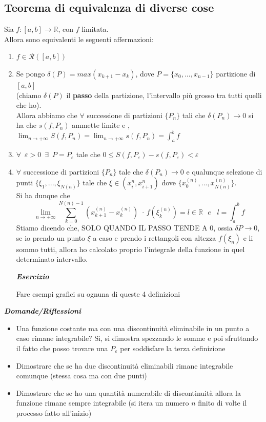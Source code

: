 \documentclass{article}
\theoremstyle{definition}
\newcommand{\R}{\mathbb{R}}
\begin{document}
\subsection{Teorema di equivalenza di diverse cose}
Sia $f:[a,b] \to \R$, con $f$ limitata.
\\
Allora sono equivalenti le seguenti affermazioni:
\begin{enumerate}
    \item $f \in \mathcal{R}([a,b])$
    \item Se pongo $\delta(P)=max (x_{k+1}-x_k)$, dove $P=\{x_0,...,x_{n-1}\}$ partizione di $[a,b]$
    \\
    (chiamo $\delta(P)$ il \textbf{passo} della partizione, l'intervallo più grosso tra tutti quelli che ho).
    \\
    Allora abbiamo che $\forall$ successione di partizioni $\{P_n\}$ tali che $\delta(P_n) \to 0$ si ha che $s(f,P_n)$ ammette limite e , $\lim_{n \to +\infty} S(f,P_n)=\lim_{n \to +\infty}s(f,P_n)=\int_a^b f$
    \item $\forall \,\,\, \varepsilon > 0 \,\,\, \exists \,\,\, P=P_\varepsilon$ tale che $0 \leqslant S(f,P_\varepsilon)-s(f,P_\varepsilon) < \varepsilon$
    \item $\forall $ successione di partizioni $\{P_n\}$ tale che $\delta(P_n) \to 0$ e qualunque selezione di punti $\{\xi_1,...,\xi_{N(n)}\}$ tale che $\xi \in (x_i^n, x_{i+1}^n)$ dove $\{x_0^{(n)},...,x_{N(n)}^{(n)}\}$.
    \\
    Si ha dunque che
    \begin{equation}
    \lim_{n \to +\infty} \sum_{k=0}^{N(n)-1}(x_{k+1}^{(n)}-x_k^{(n)}) \,\, \cdot \, f(\xi_k^{(n)})=l \in \R \,\,\,\, e \,\,\,\,\,   l= \int_a^b f 
    \end{equation}
    Stiamo dicendo che, SOLO QUANDO IL PASSO TENDE A 0, ossia $\delta P \to 0$, se io prendo un punto $\xi$ a caso e prendo i rettangoli con altezza $f(\xi_n)$ e li sommo tutti, allora ho calcolato proprio l'integrale della funzione in quel determinato intervallo.
    \begin{center}
        \textbf{\textit{Esercizio}}
    \end{center}
    Fare esempi grafici su ognuna di queste 4 definizioni
\end{enumerate}
\begin{center}
    \textbf{\textit{Domande/Riflessioni}}
\end{center}
\begin{itemize}
    \item Una funzione costante ma con una discontinuità eliminabile in un punto a caso rimane integrabile? Sì, si dimostra spezzando le somme e poi sfruttando il fatto che posso trovare una $P_\varepsilon$ per soddisfare la terza definizione
    \item Dimostrare che se ha due discontinuità eliminabili rimane integrabile comunque (stessa cosa ma con due punti)
    \item Dimostrare che se ho una quantità numerabile di discontinuità allora la funzione rimane sempre integrabile (si itera un numero $n$ finito di volte il processo fatto all'inizio)
\end{itemize}
\end{document}
